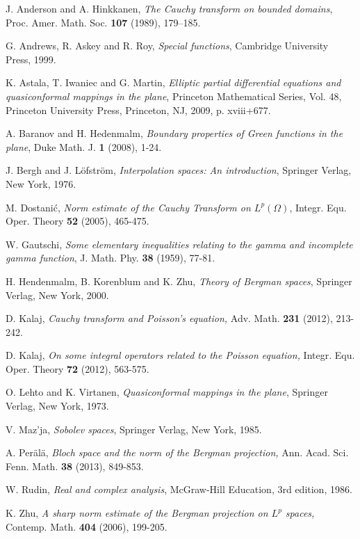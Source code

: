 \documentclass[a4paper,12pt]{amsart}
\theoremstyle{definition}
\numberwithin{equation}{section}
\begin{document}
\begin{thebibliography}{1}

J. Anderson and A. Hinkkanen,  \emph{The Cauchy transform on bounded domains},
Proc. Amer. Math. Soc. \textbf{107} (1989), 179--185.

G. Andrews, R. Askey and R. Roy,
\emph{Special functions},
Cambridge University Press, 1999.

K. Astala, T. Iwaniec and G. Martin,  \emph{Elliptic partial differential equations and quasiconformal mappings in the plane},
Princeton Mathematical Series, Vol. 48, Princeton University Press, Princeton, NJ, 2009, p. xviii+677.

A. Baranov and H. Hedenmalm,
\emph{Boundary properties of Green functions in the plane},
Duke Math. J. \textbf{1} (2008), 1-24.

J. Bergh and J. L\"ofstr\"om,
\emph{Interpolation spaces: An introduction},
Springer Verlag, New York, 1976.

M. Dostani\'c, \emph{Norm estimate of the Cauchy Transform on $L^p(\Omega)$},
Integr. Equ. Oper. Theory \textbf{52} (2005), 465-475.


W. Gautschi, \emph{Some elementary inequalities relating to the gamma and incomplete gamma function},
J. Math. Phy. \textbf{38} (1959), 77-81.

H. Hendenmalm, B. Korenblum and K. Zhu, \emph{Theory of Bergman spaces},
Springer Verlag, New York, 2000.

D. Kalaj,
\emph{Cauchy transform and Poisson's equation,}
Adv. Math. \textbf{231} (2012), 213-242.

D. Kalaj,
\emph{On some integral operators related to the Poisson equation, }
Integr. Equ. Oper. Theory \textbf{72} (2012), 563-575.

O. Lehto and K. Virtanen,
\emph{Quasiconformal mappings in the plane},
Springer Verlag, New York, 1973.

V. Maz'ja,
\emph{Sobolev spaces},
Springer Verlag, New York, 1985.

A. Per\"al\"a,
\emph{Bloch space and the norm of the Bergman projection, }
Ann. Acad. Sci. Fenn. Math. \textbf{38} (2013), 849-853.

W. Rudin,
\emph{Real and complex analysis},
McGraw-Hill Education, 3rd edition, 1986.

K. Zhu,
\emph{ A sharp norm estimate of the Bergman projection on $L^p$ spaces, }
Contemp. Math. \textbf{404} (2006), 199-205.

\end{thebibliography}
\end{document}
